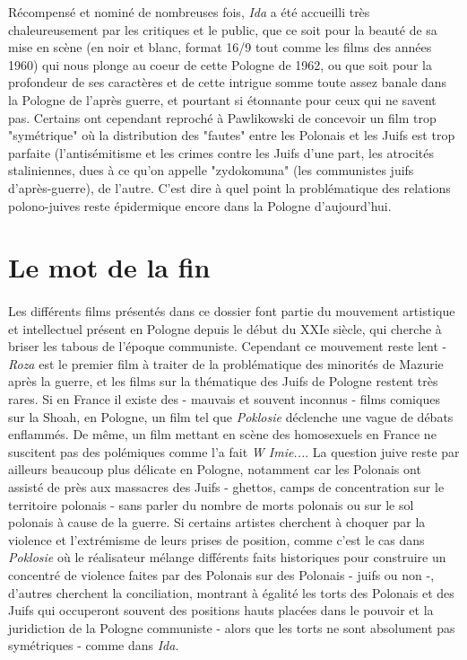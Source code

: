 \documentclass[12pt, twocolumn]{amsart}
\begin{document}
Récompensé et nominé de nombreuses fois, \emph{Ida} a été accueilli très chaleureusement par les critiques et le public, que ce soit pour la beauté de sa mise en scène (en noir et blanc, format 16/9 tout comme les films des années 1960) qui nous plonge au coeur de cette Pologne de 1962, ou que soit pour la profondeur de ses caractères et de cette intrigue somme toute assez banale dans la Pologne de l'après guerre, et pourtant si étonnante pour ceux qui ne savent pas. Certains ont cependant reproché à Pawlikowski de concevoir un film trop "symétrique" où la distribution des "fautes" entre les Polonais et les Juifs est trop parfaite (l'antisémitisme et les crimes contre les Juifs d'une part, les atrocités staliniennes, dues à ce qu'on appelle "zydokomuna" (les communistes juifs d'après-guerre), de l'autre. C'est dire à quel point la problématique des relations polono-juives reste épidermique encore dans la Pologne d'aujourd'hui. 

\cleartoevenpage

\section*{Le mot de la fin}
\vspace*{10mm}
\paragraph*{}
Les différents films présentés dans ce dossier font partie du mouvement artistique et intellectuel présent en Pologne depuis le début du XXIe siècle, qui cherche à briser les tabous de l'époque communiste. Cependant ce mouvement reste lent - \emph{Roza} est le premier film à traiter de la problématique des minorités de Mazurie après la guerre, et les films sur la thématique des Juifs de Pologne restent très rares. Si en France il existe des - mauvais et souvent inconnus - films comiques sur la Shoah, en Pologne, un film tel que \emph{Poklosie} déclenche une vague de débats enflammés. De même, un film mettant en scène des homosexuels en France ne suscitent pas des polémiques comme l'a fait \emph{W Imie...}. La question juive reste par ailleurs beaucoup plus délicate en Pologne, notamment car les Polonais ont assisté de près aux massacres des Juifs - ghettos, camps de concentration sur le territoire polonais - sans parler du nombre de morts polonais ou sur le sol polonais à cause de la guerre. Si certains artistes cherchent à choquer par la violence et l'extrémisme de leurs prises de position, comme c'est le cas dans \emph{Poklosie} où le réalisateur mélange différents faits historiques pour construire un concentré de violence faites par des Polonais sur des Polonais - juifs ou non -, d'autres cherchent la conciliation, montrant à égalité les torts des Polonais et des Juifs qui occuperont souvent des positions hauts placées dans le pouvoir et la juridiction de la Pologne communiste - alors que les torts ne sont absolument pas symétriques - comme dans \emph{Ida}.
\end{document}
